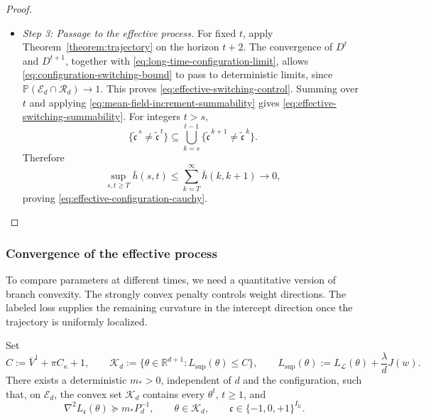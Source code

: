 \begin{proof}
\begin{itemize}[wide]
\item \emph{Step 3: Passage to the effective process.}
For fixed $t$, apply Theorem~\ref{theorem:trajectory} on the
horizon $t+2$. The convergence of $D^t$ and $D^{t+1}$, together
with \eqref{eq:long-time-configuration-limit}, allows
\eqref{eq:configuration-switching-bound} to pass to deterministic
limits, since $\mathbb P(\mathcal E_d\cap\mathcal R_d)\to1$.
This proves \eqref{eq:effective-switching-control}. Summing over
$t$ and applying \eqref{eq:mean-field-increment-summability}
gives \eqref{eq:effective-switching-summability}.
For integers $t>s$,
\[
    \{\tilde{\mathfrak c}^{\,s}\neq\tilde{\mathfrak c}^{\,t}\}
    \subseteq\bigcup_{k=s}^{t-1}
        \{\tilde{\mathfrak c}^{\,k+1}\neq\tilde{\mathfrak c}^{\,k}\}.
\]
Therefore
\[
    \sup_{s,t\geq T}\bar h(s,t)
    \leq\sum_{k=T}^{\infty}\bar h(k,k+1)\longrightarrow0,
\]
proving \eqref{eq:effective-configuration-cauchy}.

\end{itemize}

\end{proof}

\subsubsection{Convergence of the effective process}
\label{subsubsec:convergence-effective-process}

To compare parameters at different times, we need a quantitative
version of branch convexity. The strongly convex penalty controls weight
directions. The labeled loss supplies the remaining curvature in
the intercept direction once the trajectory is uniformly localized.

\begin{lemma}
\label{lem:uniform-branch-curvature}
Set
\[
    C:=\bar V^1+\pi C_\kappa+1,
    \qquad
    \mathcal K_d:=\{\theta \in \mathbb{R}^{d+1}:L_{\mathrm{sup}}(\theta)\leq C\},
    \qquad
    L_{\mathrm{sup}}(\theta)
    :=L_{\mathcal L}(\theta)+\frac{\lambda}{d}J(w).
\]
There exists a deterministic $m_*>0$, independent of $d$
and the configuration, such that, on $\mathcal E_d$,
the convex set $\mathcal K_d$ contains every $\theta^t$,
$t\geq1$, and
\begin{equation}
    \nabla^2L_{\mathfrak c}(\theta)\succeq m_*P_d^{-1},
    \qquad\theta\in\mathcal K_d,
    \qquad\mathfrak c\in\{-1,0,+1\}^{I_{\mathcal U}}.
    \label{eq:long-time-uniform-lower-curvature}
\end{equation}
\end{lemma}

